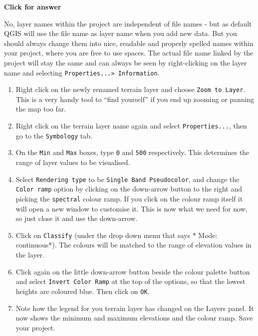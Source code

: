 \documentclass[
  letterpaper,
  DIV=11,
  numbers=noendperiod]{scrreprt}
\begin{document}
\begin{tcolorbox}[enhanced jigsaw, toprule=.15mm, breakable, left=2mm, colframe=quarto-callout-important-color-frame, colback=white, arc=.35mm, leftrule=.75mm, opacityback=0, rightrule=.15mm, bottomrule=.15mm]

\vspace{-3mm}\textbf{Click for answer}\vspace{3mm}

No, layer names within the project are independent of file names - but
as default QGIS will use the file name as layer name when you add new
data. But you should always change them into nice, readable and properly
spelled names within your project, where you are free to use spaces. The
actual file name linked by the project will stay the same and can always
be seen by right-clicking on the layer name and selecting
\texttt{Properties...\textgreater{}\ Information}.

\end{tcolorbox}

\begin{enumerate}
\def\labelenumi{(\arabic{enumi})}
\setcounter{enumi}{17}
\item
  Right click on the newly renamed terrain layer and choose
  \texttt{Zoom\ to\ Layer}. This is a very handy tool to ``find
  yourself'' if you end up zooming or panning the map too far.
\item
  Right click on the terrain layer name again and select
  \texttt{Properties...}, then go to the \texttt{Symbology} tab.
\item
  On the \texttt{Min} and \texttt{Max} boxes, type \texttt{0} and
  \texttt{500} respectively. This determines the range of layer values
  to be visualised.
\item
  Select \texttt{Rendering\ type} to be
  \texttt{Single\ Band\ Pseudocolor}, and change the
  \texttt{Color\ ramp} option by clicking on the down-arrow button to
  the right and picking the \texttt{spectral} colour ramp. If you click
  on the colour ramp itself it will open a new window to customise it.
  This is now what we need for now, so just close it and use the
  down-arrow.
\item
  Click on \texttt{Classify} (under the drop down menu that says * Mode:
  continuous*). The colours will be matched to the range of elevation
  values in the layer.
\item
  Click again on the little down-arrow button beside the colour palette
  button and select \texttt{Invert\ Color\ Ramp} at the top of the
  options, so that the lowest heights are coloured blue. Then click on
  \texttt{OK}.
\item
  Note how the legend for you terrain layer has changed on the Layers
  panel. It now shows the minimum and maximum elevations and the colour
  ramp. Save your project.
\end{enumerate}
\end{document}
